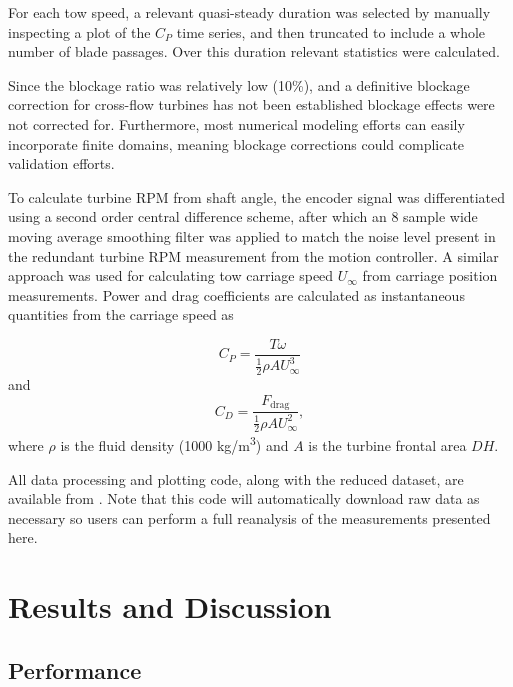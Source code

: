 \documentclass[10pt,letterpaper]{article}
\begin{document}
For each tow speed, a relevant quasi-steady duration was selected by manually
inspecting a plot of the $C_P$ time series, and then truncated to include a
whole number of blade passages. Over this duration relevant statistics were
calculated. 

Since the blockage ratio was relatively low (10\%), and a definitive blockage
correction for cross-flow turbines has not been established \cite{Cavagnaro2014}
blockage effects were not corrected for. Furthermore, most numerical modeling
efforts can easily incorporate finite domains, meaning blockage corrections
could complicate validation efforts.

To calculate turbine RPM from shaft angle, the encoder signal was differentiated
using a second order central difference scheme, after which an 8 sample wide
moving average smoothing filter was applied to match the noise level present in
the redundant turbine RPM measurement from the motion controller. A similar
approach was used for calculating tow carriage speed $U_\infty$ from carriage
position measurements. Power and drag coefficients are calculated as
instantaneous quantities from the carriage speed as

\begin{equation}
    C_P = \frac{T \omega}{\frac{1}{2} \rho A U_\infty^3}
\end{equation}
and
\begin{equation}
    C_D = \frac{F_\mathrm{drag}}{\frac{1}{2} \rho A U_\infty^2},
\end{equation}
where $\rho$ is the fluid density (1000 kg/m\textsuperscript{3}) and $A$ is
the turbine frontal area $DH$.

All data processing and plotting code, along with the reduced dataset, are
available from \cite{Bachant2015-RM2-data}. Note that this code will
automatically download raw data as necessary so users can perform a full
reanalysis of the measurements presented here.


\section*{Results and Discussion}

\subsection*{Performance}
\end{document}
